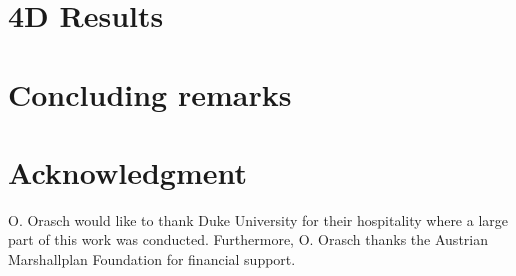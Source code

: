 \documentclass{PoS}
\begin{document}
\newpage

\section{4D Results}

\newpage


\section{Concluding remarks}

\section{Acknowledgment}
O. Orasch would like to thank Duke University for their hospitality where a large part of this work was conducted. Furthermore, O. Orasch thanks the Austrian Marshallplan Foundation for financial support.
 
\end{document}
